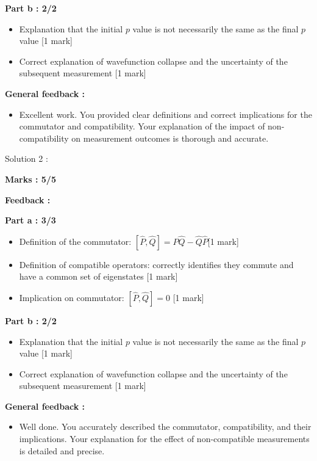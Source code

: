 \documentclass[a4paper,11pt]{article}
\begin{document}
\textbf{Part b : 2/2}

\begin{itemize}
    \item Explanation that the initial $p$ value is not necessarily the same as the final $p$ value [1 mark]
    \item Correct explanation of wavefunction collapse and the uncertainty of the subsequent measurement [1 mark]
\end{itemize}

\textbf{General feedback :}

\begin{itemize}
    \item Excellent work. You provided clear definitions and correct implications for the commutator and compatibility. Your explanation of the impact of non-compatibility on measurement outcomes is thorough and accurate.
\end{itemize}


Solution 2 :

\textbf{Marks : 5/5}

\textbf{Feedback :}

\textbf{Part a : 3/3}

\begin{itemize}
    \item Definition of the commutator: $[\hat{P},\hat{Q}] = \hat{P}\hat{Q} - \hat{Q}\hat{P}$[1 mark]
    \item Definition of compatible operators: correctly identifies they commute and have a common set of eigenstates [1 mark]
    \item Implication on commutator: $[\hat{P},\hat{Q}] = 0$ [1 mark]
\end{itemize}

\textbf{Part b : 2/2}

\begin{itemize}
    \item Explanation that the initial $p$ value is not necessarily the same as the final $p$ value [1 mark]
    \item Correct explanation of wavefunction collapse and the uncertainty of the subsequent measurement [1 mark]
\end{itemize}


\textbf{General feedback :}

\begin{itemize}
    \item Well done. You accurately described the commutator, compatibility, and their implications. Your explanation for the effect of non-compatible measurements is detailed and precise.
\end{itemize}
\end{document}
